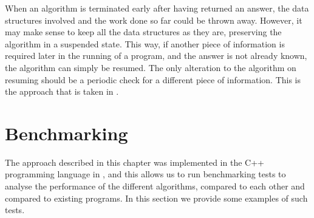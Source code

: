 When an algorithm is terminated early after having returned an answer, the data
structures involved and the work done so far could be thrown away.  However, it
may make sense to keep all the data structures as they are, preserving the
algorithm in a suspended state.  This way, if another piece of information is
required later in the running of a program, and the answer is not already known,
the algorithm can simply be resumed.  The only alteration to the algorithm on
resuming should be a periodic check for a different piece of information.  This
is the approach that is taken in \libsemigroups{}.




\section{Benchmarking}
\label{sec:benchmarking}

The approach described in this chapter was implemented in the C++ programming
language in \libsemigroups{} \cite{libsemigroups}, and this allows us to
run benchmarking tests to analyse the performance of the different algorithms,
compared to each other and compared to existing programs.  In this section we
provide some examples of such tests.

